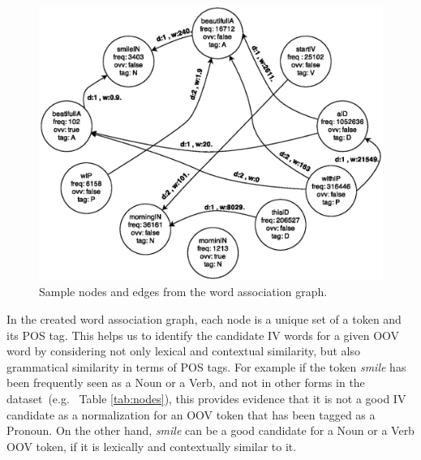 \documentclass[preprint,review,12pt]{elsarticle}
\begin{document}
\begin{figure}[htb]
\begin{center}
\includegraphics[scale=0.6]{fig/graph}
\caption{Sample nodes and edges from the word association graph.}
\label{fig:graph}
\end{center}
\end{figure}



In the created word association graph, each node is a unique set of a token and its POS tag. This helps us to identify the candidate IV words for a given OOV word by considering not only lexical and contextual similarity, but also grammatical similarity in terms of POS tags. For example if the token \textit{smile} has been frequently seen as a Noun or a Verb, and not in other forms in the dataset~(e.g. ~Table \ref{tab:nodes}), this provides evidence that it is not a good IV candidate as a normalization for an OOV token that has  been tagged as a Pronoun. On the other hand, \textit{smile} can be a good candidate for a Noun or a Verb OOV token, if it is lexically and contextually similar to it.
\end{document}
